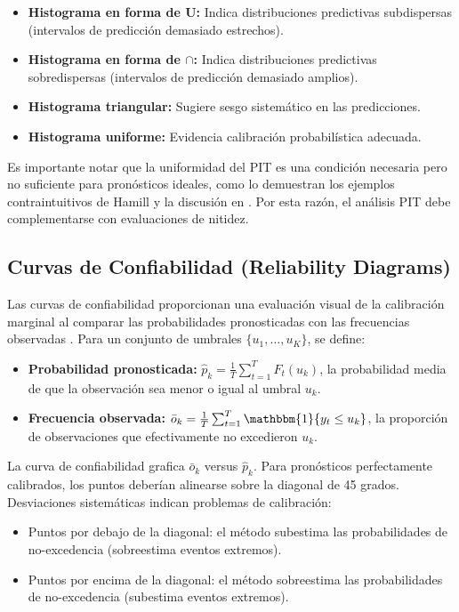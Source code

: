 \begin{itemize}
\item \textbf{Histograma en forma de U:} Indica distribuciones predictivas subdispersas (intervalos de predicción demasiado estrechos).
\item \textbf{Histograma en forma de $\cap$:} Indica distribuciones predictivas sobredispersas (intervalos de predicción demasiado amplios).
\item \textbf{Histograma triangular:} Sugiere sesgo sistemático en las predicciones.
\item \textbf{Histograma uniforme:} Evidencia calibración probabilística adecuada.
\end{itemize}

Es importante notar que la uniformidad del PIT es una condición necesaria pero no suficiente para pronósticos ideales, como lo demuestran los ejemplos contraintuitivos de Hamill \parencite{Hamill2001} y la discusión en \textcite{GneitingBalabdaoui2007}. Por esta razón, el análisis PIT debe complementarse con evaluaciones de nitidez.

\subsection{Curvas de Confiabilidad (Reliability Diagrams)}

Las curvas de confiabilidad proporcionan una evaluación visual de la calibración marginal al comparar las probabilidades pronosticadas con las frecuencias observadas \parencite{GneitingBalabdaoui2007}. Para un conjunto de umbrales $\{u_1, \ldots, u_K\}$, se define:

\begin{itemize}
\item \textbf{Probabilidad pronosticada:} $\hat{p}_k = \frac{1}{T}\sum_{t=1}^T F_t(u_k)$, la probabilidad media de que la observación sea menor o igual al umbral $u_k$.
\item \textbf{Frecuencia observada:} $\bar{o}_k = \frac{1}{T}\sum_{t=1}^T \mathbbm{1}\{y_t \leq u_k\}$, la proporción de observaciones que efectivamente no excedieron $u_k$.
\end{itemize}

La curva de confiabilidad grafica $\bar{o}_k$ versus $\hat{p}_k$. Para pronósticos perfectamente calibrados, los puntos deberían alinearse sobre la diagonal de 45 grados. Desviaciones sistemáticas indican problemas de calibración:

\begin{itemize}
\item Puntos por debajo de la diagonal: el método subestima las probabilidades de no-excedencia (sobreestima eventos extremos).
\item Puntos por encima de la diagonal: el método sobreestima las probabilidades de no-excedencia (subestima eventos extremos).
\end{itemize}

